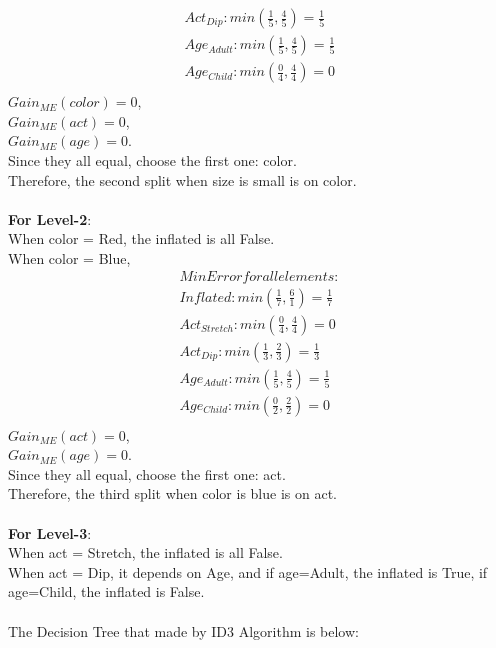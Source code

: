 \documentclass{article}
\begin{document}
\begin{enumerate}
\begin{enumerate}
\begin{equation*}
\begin{split}
	Act_{Dip}: min(\frac{1}{5}, \frac{4}{5}) = \frac{1}{5}\\
	Age_{Adult}: min(\frac{1}{5}, \frac{4}{5}) = \frac{1}{5}\\
	Age_{Child}: min(\frac{0}{4}, \frac{4}{4}) = 0\\
	\end{split}
	\end{equation*}
            $Gain_{ME}(color)=0$, \\
            $Gain_{ME}(act)=0$, \\
            $Gain_{ME}(age)=0$. \\
            Since they all equal, choose the first one: color.\\
            Therefore, the second split when size is small is on color.\\\\
            \textbf{For Level-2}:\\
            When color = Red, the inflated is all False.\\
            When color = Blue, \\
            \begin{equation*}
            \begin{split}
            MinError for all elements:\\
	Inflated: min(\frac{1}{7}, \frac{6}{1}) = \frac{1}{7}\\
	Act_{Stretch}: min(\frac{0}{4}, \frac{4}{4}) = 0\\
	Act_{Dip}: min(\frac{1}{3}, \frac{2}{3}) = \frac{1}{3}\\
	Age_{Adult}: min(\frac{1}{5}, \frac{4}{5}) = \frac{1}{5}\\
	Age_{Child}: min(\frac{0}{2}, \frac{2}{2}) = 0\\
	\end{split}
	\end{equation*}
            $Gain_{ME}(act)=0$, \\
            $Gain_{ME}(age)=0$. \\
            Since they all equal, choose the first one: act.\\
            Therefore, the third split when color is blue is on act.\\\\
            \textbf{For Level-3}:\\
            When act = Stretch, the inflated is all False.\\
            When act = Dip, it depends on Age, and if age=Adult, the inflated is True, if age=Child, the inflated is False.\\
            \\The Decision Tree that made by ID3 Algorithm is below:\\


\end{enumerate}
\end{enumerate}
\end{document}
